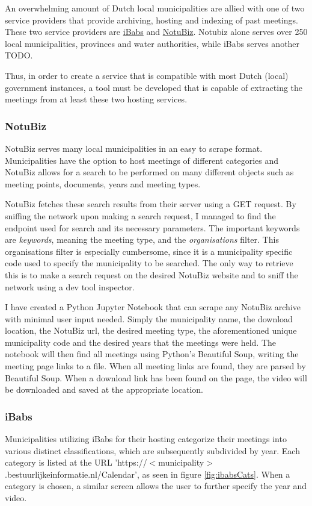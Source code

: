 \documentclass[twoside]{uva-inf-bachelor-thesis}
\begin{document}
An overwhelming amount of Dutch local municipalities are allied with one of two service providers that provide archiving, hosting and indexing of past meetings. These two service providers are \href{https://www.ibabs.com}{iBabs} and \href{https://www.notubiz.nl/}{NotuBiz}. Notubiz alone serves over 250 local municipalities, provinces and water authorities, while iBabs serves another TODO. 

Thus, in order to create a service that is compatible with most Dutch (local) government instances, a tool must be developed that is capable of extracting the meetings from at least these two hosting services.

\subsubsection{NotuBiz}
NotuBiz serves many local municipalities in an easy to scrape format. Municipalities have the option to host meetings of different categories and NotuBiz allows for a search to be performed on many different objects such as meeting points, documents, years and meeting types. 

NotuBiz fetches these search results from their server using a GET request. By sniffing the network upon making a search request, I managed to find the endpoint used for search and its necessary parameters. The important keywords are \textit{keywords}, meaning the meeting type, and the \textit{organisations} filter. This organisations filter is especially cumbersome, since it is a municipality specific code used to specify the municipality to be searched. The only way to retrieve this is to make a search request on the desired NotuBiz website and to sniff the network using a dev tool inspector. 

I have created a Python Jupyter Notebook that can scrape any NotuBiz archive with minimal user input needed. Simply the municipality name, the download location, the NotuBiz url, the desired meeting type, the aforementioned unique municipality code and the desired years that the meetings were held. 
The notebook will then find all meetings using Python's Beautiful Soup, writing the meeting page links to a file. When all meeting links are found, they are parsed by Beautiful Soup. When a download link has been found on the page, the video will be downloaded and saved at the appropriate location.

\subsubsection{iBabs}
Municipalities utilizing iBabs for their hosting categorize their meetings into various distinct classifications, which are subsequently subdivided by year.
Each category is listed at the URL 'https://$<$municipality$>$.bestuurlijkeinformatie.nl/Calendar', as seen in figure \ref{fig:ibabsCats}. When a category is chosen, a similar screen allows the user to further specify the year and video.
\end{document}
